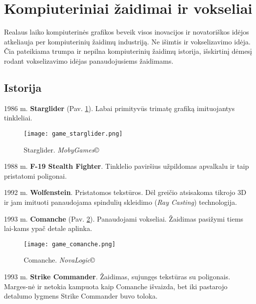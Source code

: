 \section{Kompiuteriniai žaidimai ir vokseliai}

Realaus laiko kompiuterinės grafikos beveik visos inovacijos ir novatoriškos
idėjos atkeliauja per kompiuterinių žaidimų industriją. Ne išimtis ir
vokselizavimo idėja. Čia pateikiama trumpa ir nepilna kompiuterinių žaidimų
istorija, išskirtinį dėmesį rodant vokselizavimo idėjas panaudojusiems
žaidimams.

\subsection{Istorija}

\begin{list}
{
}
{
  \setlength\leftmargin{2.43cm}
  \setlength{}
  \setlength{}
}

\item[1986 m.] {\bf Starglider} (Pav. \ref{fig:game_starglider}). Labai
primityvūs trimatę grafiką imituojantys tinkleliai.

\begin{figure}[!ht]
\centering
\texttt{[image: game\_starglider.png]}
\caption{Starglider. \emph{MobyGames}\copyright}
\label{fig:game_starglider}
\end{figure}

\item[1988 m.] {\bf F-19 Stealth Fighter}. Tinklelio paviršius užpildomas apvalkalu
ir taip pristatomi poligonai.

\item[1992 m.] {\bf Wolfenstein}. Pristatomos tekstūros. Dėl greičio
atsisakoma tikrojo 3D ir jam imituoti panaudojama spindulių skleidimo
(\emph{Ray Casting}) technologija.

\item[1993 m.] {\bf Comanche} (Pav. \ref{fig:game_comanche}). Panaudojami
vokseliai. Žaidimas pasižymi tiems lai-kams ypač detale aplinka.

\begin{figure}[!ht]
\centering
\texttt{[image: game\_comanche.png]}
\caption{Comanche. \emph{NovaLogic}\copyright}
\label{fig:game_comanche}
\end{figure}

\item[1993 m.] {\bf Strike Commander}. Žaidimas, sujungęs tekstūras su
poligonais. Marges-nė ir netokia kampuota kaip Comanche išvaizda, bet iki
pastarojo detalumo lygmens Strike Commander buvo toloka.


\end{list}
